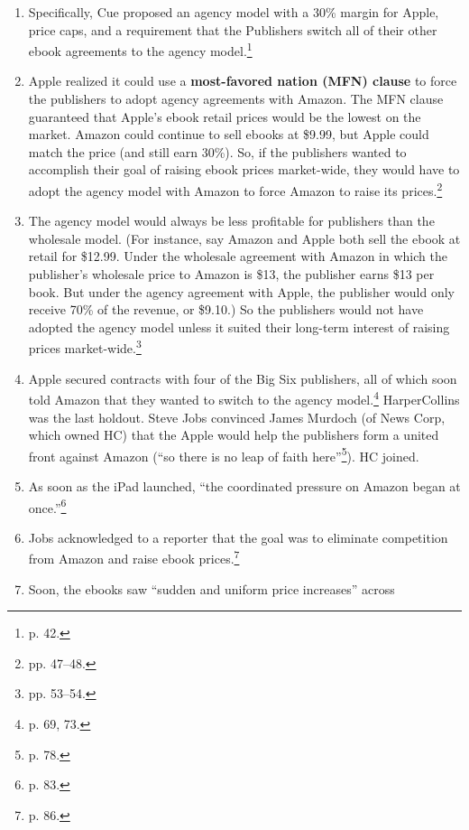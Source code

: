 \begin{enumerate}
\begin{enumerate}
        move all of their e-tailers to agency.''\footnote{pp. 39--40.}
        \item Specifically, Cue proposed an agency model with a 30\% margin for 
        Apple, price caps, and a requirement that the Publishers switch all of 
        their other ebook agreements to the agency model.\footnote{p. 42.}
        \item Apple realized it could use a \textbf{most-favored nation (MFN) 
        clause} to force the publishers to adopt agency agreements with Amazon. 
        The MFN clause guaranteed that Apple's ebook retail prices would be the 
        lowest on the market. Amazon could continue to sell ebooks at \$9.99, 
        but Apple could match the price (and still earn 30\%). So, if the 
        publishers wanted to accomplish their goal of raising ebook prices 
        market-wide, they would have to adopt the agency model with Amazon to 
        force Amazon to raise its prices.\footnote{pp. 47--48.}
        \item The agency model would always be less profitable for publishers 
        than the wholesale model. (For instance, say Amazon and Apple both sell 
        the ebook at retail for \$12.99. Under the wholesale agreement with 
        Amazon in which the publisher's wholesale price to Amazon is \$13, the 
        publisher earns \$13 per book. But under the agency agreement with 
        Apple, the publisher would only receive 70\% of the revenue, or \$9.10.) 
        So the publishers would not have adopted the agency model unless it 
        suited their long-term interest of raising prices 
        market-wide.\footnote{pp. 53--54.}
        \item Apple secured contracts with four of the Big Six publishers, all 
        of which soon told Amazon that they wanted to switch to the agency 
        model.\footnote{p. 69, 73.} HarperCollins was the last holdout. Steve 
        Jobs convinced James Murdoch (of News Corp, which owned HC) that the 
        Apple would help the publishers form a united front against Amazon 
        (``so there is no leap of faith here''\footnote{p. 78.}). HC joined.
        \item As soon as the iPad launched, ``the coordinated pressure on Amazon 
        began at once.''\footnote{p. 83.}
        \item Jobs acknowledged to a reporter that the goal was to eliminate 
        competition from Amazon and raise ebook prices.\footnote{p. 86.}
        \item Soon, the ebooks saw ``sudden and uniform price increases'' across 

\end{enumerate}
\end{enumerate}
